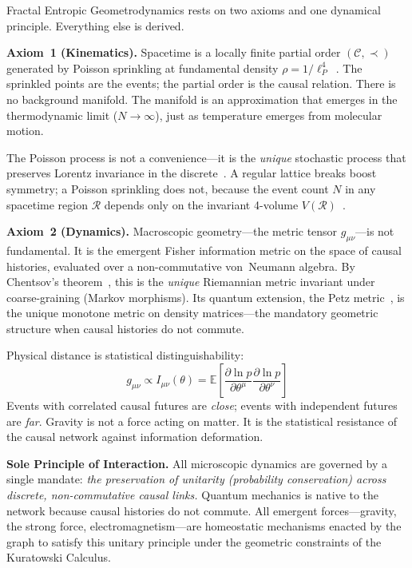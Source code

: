 \documentclass[aps,prd,twocolumn,superscriptaddress,nofootinbib,amsmath,amssymb,longbibliography]{revtex4-2}
\newcommand{\lp}{\ell_P}
\begin{document}
Fractal Entropic Geometrodynamics rests on two axioms and one dynamical
principle.  Everything else is derived.

\textbf{Axiom~1 (Kinematics).}
Spacetime is a locally finite partial order $(\mathcal{C}, \prec)$
generated by Poisson sprinkling at fundamental density
$\rho = 1/\lp^4$~\cite{bombelli1987}.
The sprinkled points are the events; the partial order is the causal
relation.
There is no background manifold.
The manifold is an approximation that emerges in the thermodynamic
limit ($N \to \infty$), just as temperature emerges from molecular
motion.

The Poisson process is not a convenience---it is the \emph{unique}
stochastic process that preserves Lorentz invariance in the
discrete~\cite{bombelli2009}.
A regular lattice breaks boost symmetry; a Poisson sprinkling does not,
because the event count $N$ in any spacetime region $\mathcal{R}$
depends only on the invariant 4-volume
$V(\mathcal{R})$~\cite{kingman1993}.

\textbf{Axiom~2 (Dynamics).}
Macroscopic geometry---the metric tensor $g_{\mu\nu}$---is not fundamental.
It is the emergent Fisher information metric on the space of causal
histories, evaluated over a non-commutative von~Neumann algebra.
By Chentsov's theorem~\cite{chentsov1982}, this is the \emph{unique}
Riemannian metric invariant under coarse-graining (Markov morphisms).
Its quantum extension, the Petz metric~\cite{petz1996}, is the unique
monotone metric on density matrices---the mandatory geometric structure
when causal histories do not commute.

Physical distance is statistical distinguishability:
\begin{equation}\label{eq:fisher}
  g_{\mu\nu} \propto I_{\mu\nu}(\theta)
  = \mathbb{E}\!\left[
    \frac{\partial \ln p}{\partial \theta^\mu}
    \frac{\partial \ln p}{\partial \theta^\nu}
  \right]
\end{equation}
Events with correlated causal futures are \emph{close};
events with independent futures are \emph{far}.
Gravity is not a force acting on matter.  It is the statistical
resistance of the causal network against information deformation.

\textbf{Sole Principle of Interaction.}
All microscopic dynamics are governed by a single mandate:
\emph{the preservation of unitarity (probability conservation)
across discrete, non-commutative causal links.}
Quantum mechanics is native to the network because causal histories
do not commute.
All emergent forces---gravity, the strong force, electromagnetism---are
homeostatic mechanisms enacted by the graph to satisfy this unitary
principle under the geometric constraints of the Kuratowski Calculus.
\end{document}
